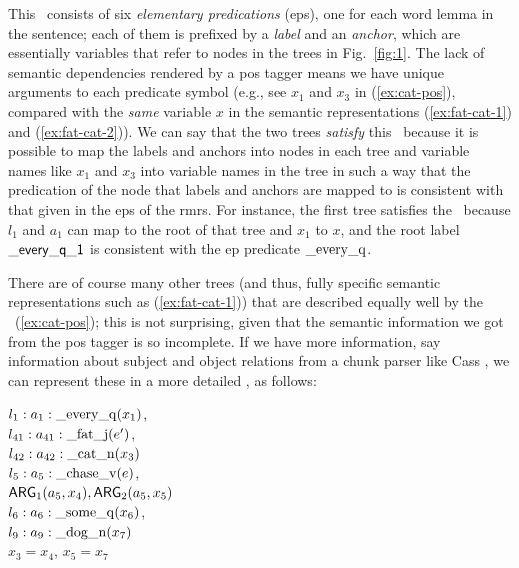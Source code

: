 This \rmrs\ consists of six \emph{elementary predications} ({\sc ep}s), one
for each word lemma in the sentence; each of them is prefixed by a
\emph{label} and an \emph{anchor}, which are essentially variables
that refer to nodes in the trees in Fig.~\ref{fig:1}.  
The lack of semantic dependencies rendered by a {\sc pos} tagger
means we have unique arguments to each
predicate symbol (e.g., see $x_1$ and $x_3$ in (\ref{ex:cat-pos}),
compared with the {\em same} variable $x$ in the semantic
representations (\ref{ex:fat-cat-1}) and (\ref{ex:fat-cat-2})).
We can say that
the two trees \emph{satisfy} this \rmrs\ because it is possible to map
the labels and anchors into nodes in each tree and variable names like
$x_1$ and $x_3$ into variable names in the tree in such a way that the
predication
of
the node that labels and anchors are mapped to is consistent with
that given in the {\sc ep}s of the {\sc rmrs}.
For instance, the first tree satisfies
the \rmrs\ because $l_1$ and $a_1$ can map to the root of that
tree and $x_1$ to $x$, and the root label
$\mathsf{\_every\_q\_1}$ is consistent with the 
{\sc ep} predicate $\mathrm{\_every\_q}$.

There are of course many other trees (and thus, fully specific
semantic representations such as (\ref{ex:fat-cat-1})) that are
described equally well by the \rmrs\ (\ref{ex:cat-pos}); this is
not surprising, 
given that the semantic information we got from the {\sc pos} tagger is so
incomplete.  If we have more information, say information about
subject and object relations from a chunk parser like Cass
\cite{abney:1996}, we can represent these in a more
detailed \rmrs, as follows:

\begin{examples}
\item 
$l_1:a_1:\mathrm{\_every\_q}(x_1)$, \\
$l_{41}:a_{41}:\mathrm{\_fat\_j}(e')$,\\
$l_{42}:a_{42}:\mathrm{\_cat\_n}(x_3)$\\
$l_5:a_5:\mathrm{\_chase\_v}(e)$, \\
\hspace*{0.1in} $\mathsf{ARG}_1(a_5,x_4),
\mathsf{ARG}_2(a_5,x_5)$\\ 
$l_6:a_6:\mathrm{\_some\_q}(x_6)$, \\
$l_9:a_9:\mathrm{\_dog\_n}(x_7)$\\
$x_3=x_4$, $x_5=x_7$
\label{ex:cat-partial-parser}
\end{examples}


